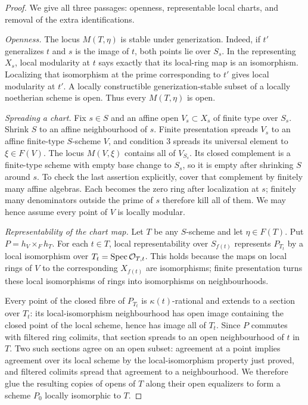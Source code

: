 \begin{proof}
We give all three passages: openness, representable local charts,
and removal of the extra identifications.

\emph{Openness.} The locus $M(T,\eta)$ is stable under
generization. Indeed, if $t'$ generalizes $t$ and $s$ is the image
of $t$, both points lie over $S_s$. In the representing $X_s$,
local modularity at $t$ says exactly that its local-ring map is an
isomorphism. Localizing that isomorphism at the prime corresponding
to $t'$ gives local modularity at $t'$. A locally constructible
generization-stable subset of a locally noetherian scheme is open.
Thus every $M(T,\eta)$ is open.

\emph{Spreading a chart.} Fix $s\in S$ and an affine open
$V_s\subset X_s$ of finite type over $S_s$. Shrink $S$ to an affine
neighbourhood of $s$. Finite presentation spreads $V_s$ to an affine
finite-type $S$-scheme $V$, and condition 3 spreads its universal
element to $\xi\in F(V)$. The locus $M(V,\xi)$ contains all of
$V_{S_s}$. Its closed complement is a finite-type scheme with
empty base change to $S_s$, so it is empty after shrinking $S$
around $s$. To check the last assertion explicitly, cover that
complement by finitely many affine algebras. Each becomes the zero
ring after localization at $s$; finitely many denominators outside
the prime of $s$ therefore kill all of them. We may hence assume
every point of $V$ is locally modular.

\emph{Representability of the chart map.} Let $T$ be any
$S$-scheme and let $\eta\in F(T)$. Put
$P=h_V\times_F h_T$. For each $t\in T$, local representability
over $S_{f(t)}$ represents $P_{T_t}$ by a local isomorphism over
$T_t=\operatorname{Spec}\mathcal O_{T,t}$. This holds because the maps on local rings
of $V$ to the corresponding $X_{f(t)}$ are isomorphisms; finite
presentation turns these local isomorphisms of rings into
isomorphisms on neighbourhoods.

Every point of the closed fibre of $P_{T_t}$ is $\kappa(t)$-rational
and extends to a section over $T_t$: its local-isomorphism
neighbourhood has open image containing the closed point of the
local scheme, hence has image all of $T_t$. Since $P$ commutes
with filtered ring colimits, that section spreads to an open
neighbourhood of $t$ in $T$. Two such sections agree on an open
subset: agreement at a point implies agreement over its local
scheme by the local-isomorphism property just proved, and filtered
colimits spread that agreement to a neighbourhood. We therefore
glue the resulting copies of opens of $T$ along their open
equalizers to form a scheme $P_0$ locally isomorphic to $T$.


\end{proof}
